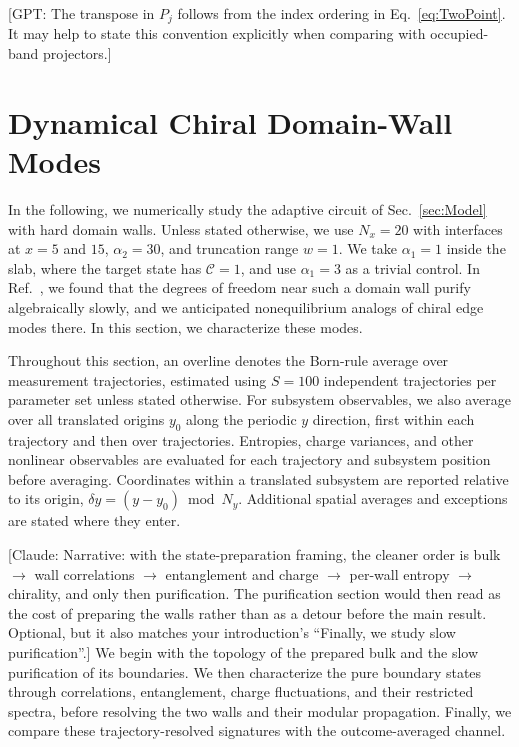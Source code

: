 \documentclass[aps,prb,10pt,twocolumn,superscriptaddress,longbibliography,floatfix]{revtex4-2}
\newcommand{\mc}[1]{\mathcal{#1}}
\newcommand{\GPT}[1]{{\color{magenta}[GPT: #1]}}
\newcommand{\claudecom}[1]{{\color{ForestGreen}[Claude: #1]}}
\begin{document}
\GPT{The transpose in $P_j$ follows from the index ordering in Eq.~\eqref{eq:TwoPoint}. It may help to state this convention explicitly when comparing with occupied-band projectors.}

\FloatBarrier
\section{Dynamical Chiral Domain-Wall Modes}
\label{sec:Results}

In the following, we numerically study the adaptive circuit of Sec.~\ref{sec:Model} with hard domain walls. Unless stated otherwise, we use $N_x=20$ with interfaces at $x=5$ and $15$, $\alpha_2=30$, and truncation range $w=1$. We take $\alpha_1=1$ inside the slab, where the target state has $\mc C=1$, and use $\alpha_1=3$ as a trivial control. In Ref.~\cite{BhuiyanPanJian2026}, we found that the degrees of freedom near such a domain wall purify algebraically slowly, and we anticipated nonequilibrium analogs of chiral edge modes there. In this section, we characterize these modes.
{\color{blue}
Throughout this section, an overline denotes the Born-rule average over measurement trajectories, estimated using $S=100$ independent trajectories per parameter set unless stated otherwise. For subsystem observables, we also average over all translated origins $y_0$ along the periodic $y$ direction, first within each trajectory and then over trajectories. Entropies, charge variances, and other nonlinear observables are evaluated for each trajectory and subsystem position before averaging. Coordinates within a translated subsystem are reported relative to its origin, $\delta y=(y-y_0)\bmod N_y$. Additional spatial averages and exceptions are stated where they enter.

\claudecom{Narrative: with the state-preparation framing, the cleaner order is bulk $\to$ wall correlations $\to$ entanglement and charge $\to$ per-wall entropy $\to$ chirality, and only then purification. The purification section would then read as the cost of preparing the walls rather than as a detour before the main result. Optional, but it also matches your introduction's ``Finally, we study slow purification''.} We begin with the topology of the prepared bulk and the slow purification of its boundaries. We then characterize the pure boundary states through correlations, entanglement, charge fluctuations, and their restricted spectra, before resolving the two walls and their modular propagation. Finally, we compare these trajectory-resolved signatures with the outcome-averaged channel.
}
\end{document}
